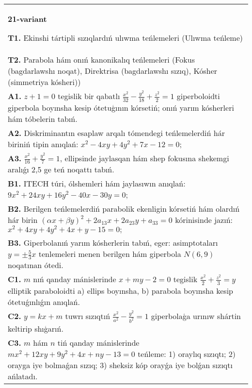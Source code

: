 \documentclass{article}
\begin{document}
\begin{tabular}{m{17cm}}
\textbf{21-variant}
\newline

\textbf{T1.} Ekinshi tártipli sızıqlardıń ulıwma teńlemeleri (Ulıwma teńleme) \\
\textbf{T2.} Parabola hám onıń kanonikalıq teńlemeleri (Fokus (bagdarlawshı noqat), Direktrisa (bagdarlawshı sızıq), Kósher (simmetriya kósheri)) \\
\textbf{A1.} $z+1=0$ tegislik bir qabatlı $\frac{x^2}{32}-\frac{y^2}{18}+\frac{z^2}{2}=1$ giperboloidti giperbola boyınsha kesip ótetuģının kórsetiń; onıń yarım kósherleri hám tóbelerin tabıń. \\
\textbf{A2.} Diskriminantın esaplaw arqalı tómendegi teńlemelerdiń hár biriniń tipin anıqlań: $x^2-4 x y+4 y^2+7 x-12=0$; \\
\textbf{A3.} $\frac{x^2}{16}+\frac{y^2}{7}=1$, ellipsinde jaylasqan hám shep fokusına shekemgi aralıǵı 2,5 ge teń noqattı tabıń. \\
\textbf{B1.} ITECH túri, ólshemleri hám jaylasıwın anıqlań: $9 x^2+24 x y+16 y^2-40 x-30 y=0$; \\
\textbf{B2.} Berilgen teńlemelerdiń parabolik ekenligin kórsetiń hám olardıń hár birin $(\alpha x+\beta y)^2+2 a_{13} x+2 a_{23} y+a_{33}=0$ kórinisinde jazıń: $x^2+4 x y+4 y^2+4 x+y-15=0 ;$ \\
\textbf{B3.} Giperbolanıń yarım kósherlerin tabıń, eger: asimptotaları $y= \pm \frac{5}{3} x$ tenlemeleri menen berilgen hám giperbola $N (6,9) $ noqatınan ótedi. \\
\textbf{C1.} $m$ nıń qanday mánislerinde $x+m y-2=0$ tegislik $\frac{x^2}{2}+\frac{z^2}{3}=y$ elliptik paraboloidti a) ellips boyınsha, b) parabola boyınsha kesip ótetuǵınlıǵın anıqlań. \\
\textbf{C2.} $y=k x+m$ tuwrı sızıqtıń $\frac{x^2}{a^2}-\frac{y^2}{b^2}=1$ giperbolaģa urınıw shártin keltirip shıģarıń. \\
\textbf{C3.} $m$ hám $n$ tiń qanday mánislerinde $m x^2+12 x y+9 y^2+4 x+n y-13=0$ teńleme: 1) oraylıq sızıqtı; 2) orayga iye bolmaǵan sızıq; 3) sheksiz kóp orayǵa iye bolǵan sızıqtı ańlatadı. \\

\end{tabular}
\vspace{1cm}
\end{document}
